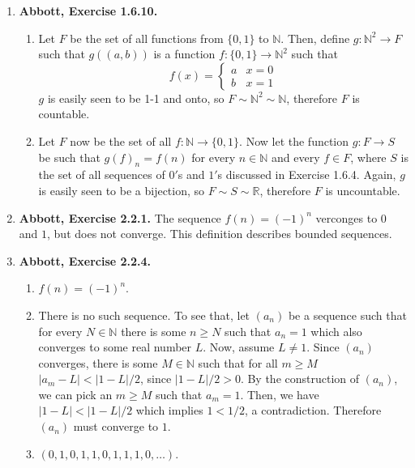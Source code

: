 \documentclass{article}
\newcommand{\N}{\mathbb{N}}
\newcommand{\R}{\mathbb{R}}
\newcommand{\exc}[2][Abbott]{\item \textbf{#1, Exercise #2.}}
\begin{document}
\begin{enumerate}
	\exc{1.6.10}
				      	          
	\begin{enumerate}
		\item Let $F$ be the set of all functions from $\{0, 1\}$ to $\N$. Then, define $g : \N^2 \rightarrow F$ such that $g((a, b))$ is a function $f : \{0, 1\} \rightarrow \N^2$ such that \begin{equation*}
		      f(x) = \begin{cases}
		      a & x = 0 \\
		      b & x = 1
		\end{cases}
		\end{equation*}
		$g$ is easily seen to be 1-1 and onto, so $F \sim \N^2 \sim \N$, therefore $F$ is countable.
							      		      	        
		\item Let $F$ now be the set of all $f : \N \rightarrow \{0, 1\}$. Now let the function $g : F \rightarrow S$ be such that $g(f)_n = f(n)$ for every $n \in \N$ and every $f \in F$, where $S$ is the set of all sequences of $0'$s and $1'$s discussed in Exercise 1.6.4. Again, $g$ is easily seen to be a bijection, so $F \sim S \sim \R$, therefore $F$ is uncountable.
	\end{enumerate}
				      	          
	\exc{2.2.1}
	The sequence $f(n) = (-1)^n$ verconges to $0$ and $1$, but does not converge. This definition describes bounded sequences.
				      	          
	\exc{2.2.4}
				      	          
	\begin{enumerate}
		\item $f(n) = (-1)^n$.
		\item There is no such sequence. To see that, let $(a_n)$ be a sequence such that for every $N \in \N$ there is some $n \geq N$ such that $a_n = 1$ which also converges to some real number $L$. Now, assume $L \neq 1$. Since $(a_n)$ converges, there is some $M \in \N$ such that for all $m \geq M$ $|a_m - L| < |1-L|/2$, since $|1-L|/2 > 0$. By the construction of $(a_n)$, we can pick an $m \geq M$ such that $a_m = 1$. Then, we have $|1-L| < |1-L|/2$ which implies $1 < 1/2$, a contradiction. Therefore $(a_n)$ must converge to $1$.
		      		      		      	      	      	      	              
		\item $(0, 1, 0, 1, 1, 0, 1, 1, 1, 0, \dots)$.
	\end{enumerate}
				      	          

\end{enumerate}
\end{document}

